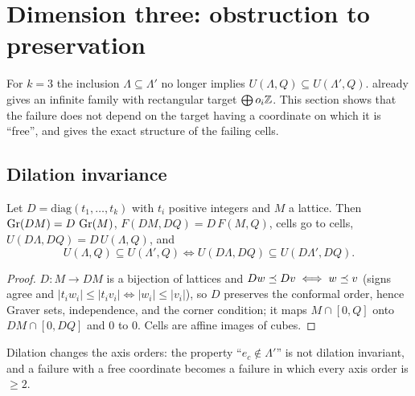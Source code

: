 \section{Dimension three: obstruction to preservation}\label{sec:obstruction}
For $k=3$ the inclusion $\Lambda\subseteq\Lambda'$ no longer implies $U(\Lambda,Q)\subseteq U(\Lambda',Q)$.  already gives an infinite family with rectangular target $\bigoplus o_i\mathbb Z$. This section shows that the failure does not depend on the target having a coordinate on which it is ``free'', and gives the exact structure of the failing cells.

\subsection{Dilation invariance}
\begin{theorem}\label{thm:D1}
Let $D=\mathrm{diag}(t_1,\dots,t_k)$ with $t_i$ positive integers and $M$ a lattice. Then $\operatorname{Gr}(DM)=D\,\operatorname{Gr}(M)$, $F(DM,DQ)=D\,F(M,Q)$, cells go to cells, $U(D\Lambda,DQ)=D\,U(\Lambda,Q)$, and
\[
U(\Lambda,Q)\subseteq U(\Lambda',Q)\iff U(D\Lambda,DQ)\subseteq U(D\Lambda',DQ).
\]
\end{theorem}
\begin{proof}
$D:M\to DM$ is a bijection of lattices and $Dw\preceq Dv\iff w\preceq v$ (signs agree and $|t_iw_i|\le|t_iv_i|\iff|w_i|\le|v_i|$), so $D$ preserves the conformal order, hence Graver sets, independence, and the corner condition; it maps $M\cap[0,Q]$ onto $DM\cap[0,DQ]$ and $0$ to $0$. Cells are affine images of cubes. \qedhere
\end{proof}
Dilation changes the axis orders: the property ``$e_c\notin\Lambda'$'' is not dilation invariant, and a failure with a free coordinate becomes a failure in which every axis order is $\ge2$.

